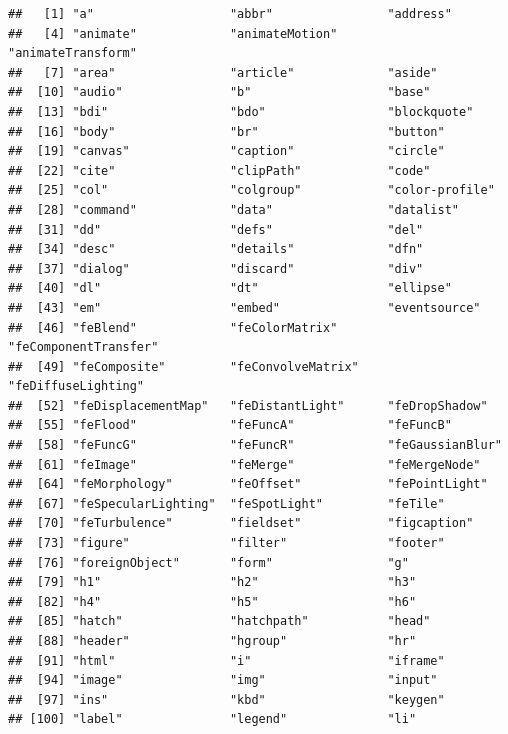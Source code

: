 \documentclass[
]{article}
\begin{document}
\begin{verbatim}
##   [1] "a"                   "abbr"                "address"            
##   [4] "animate"             "animateMotion"       "animateTransform"   
##   [7] "area"                "article"             "aside"              
##  [10] "audio"               "b"                   "base"               
##  [13] "bdi"                 "bdo"                 "blockquote"         
##  [16] "body"                "br"                  "button"             
##  [19] "canvas"              "caption"             "circle"             
##  [22] "cite"                "clipPath"            "code"               
##  [25] "col"                 "colgroup"            "color-profile"      
##  [28] "command"             "data"                "datalist"           
##  [31] "dd"                  "defs"                "del"                
##  [34] "desc"                "details"             "dfn"                
##  [37] "dialog"              "discard"             "div"                
##  [40] "dl"                  "dt"                  "ellipse"            
##  [43] "em"                  "embed"               "eventsource"        
##  [46] "feBlend"             "feColorMatrix"       "feComponentTransfer"
##  [49] "feComposite"         "feConvolveMatrix"    "feDiffuseLighting"  
##  [52] "feDisplacementMap"   "feDistantLight"      "feDropShadow"       
##  [55] "feFlood"             "feFuncA"             "feFuncB"            
##  [58] "feFuncG"             "feFuncR"             "feGaussianBlur"     
##  [61] "feImage"             "feMerge"             "feMergeNode"        
##  [64] "feMorphology"        "feOffset"            "fePointLight"       
##  [67] "feSpecularLighting"  "feSpotLight"         "feTile"             
##  [70] "feTurbulence"        "fieldset"            "figcaption"         
##  [73] "figure"              "filter"              "footer"             
##  [76] "foreignObject"       "form"                "g"                  
##  [79] "h1"                  "h2"                  "h3"                 
##  [82] "h4"                  "h5"                  "h6"                 
##  [85] "hatch"               "hatchpath"           "head"               
##  [88] "header"              "hgroup"              "hr"                 
##  [91] "html"                "i"                   "iframe"             
##  [94] "image"               "img"                 "input"              
##  [97] "ins"                 "kbd"                 "keygen"             
## [100] "label"               "legend"              "li"                 

\end{verbatim}
\end{document}
